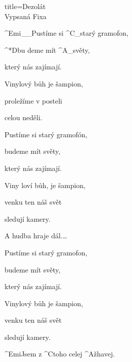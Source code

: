 \begin{song}{title=\predtitle\centering Dezolát\\\large Vypsaná Fixa \vspace*{-0.3cm}}
\begin{centerjustified}
\begin{varwidth}[t]{0.48\textwidth}
\sloka  %
	^{Emi{\color{white}\_\_}}Pustíme si ^{C{\color{white}\_}}starý gramofon, 
	
	^*{D}bu deme mít ^{A{\color{white}\_}}světy, 
	
	který nás zajímají.
	
	Vinylový bůh je šampion,
	
	proležíme v posteli 
	
	celou neděli.
	
	Pustíme si starý gramofón,
	
	budeme mít světy,
	
	který nás zajímají.
	
	Viny loví bůh, je šampion,
	
	venku ten náš svět 
	
	sledují kamery.
	
	\phantom{h}
	
	A hudba hraje dál.\elipsa\dots
	
	\phantom{h}	
	
	Pustíme si starý gramofon,
	
	budeme mít světy, 
	
	který nás zajímají.
	
	Vinylový bůh je šampion,
	
	venku ten náš svět 
	
	sledují kamery.
	
	\phantom{j}
	
	^{Emi}Jsem z ^{C}toho celej ^{A}žhavej.
	
	
\end{varwidth}

\end{centerjustified}
\setcounter{Slokočet}{0}
\end{song}
